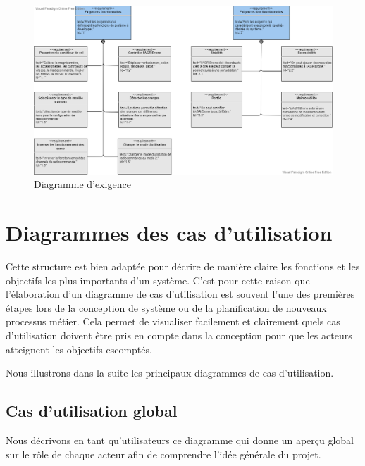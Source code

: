 	\begin{figure}[H] 
		\begin{center} 
			\centering
			\vskip 1cm
			\hspace*{-1.3cm} \includegraphics[width=1.2\linewidth]{Images/Diagramme d'exigence}
			\vskip 0.5cm
			\caption{Diagramme d'exigence}
		\end{center}
		\end {figure}
		
		
		\section{Diagrammes des cas d'utilisation }\label{Cas d'utilisation}
		
		Cette structure est bien adaptée pour décrire de manière claire les fonctions et les objectifs les plus importants d'un système. C'est pour cette raison que l'élaboration d'un diagramme de cas d'utilisation est souvent l'une des premières étapes lors de la conception de système ou de la planification de nouveaux processus métier. Cela permet de visualiser facilement et clairement quels cas d'utilisation doivent être pris en compte dans la conception pour que les acteurs atteignent les objectifs escomptés. 
		
		Nous illustrons dans la suite les principaux diagrammes de cas d'utilisation.
		\subsection{Cas d'utilisation global }
		Nous décrivons en tant qu'utilisateurs ce diagramme  qui donne un aperçu global sur le rôle de chaque acteur afin de comprendre l'idée générale du projet.
		
